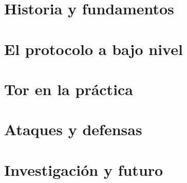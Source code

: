 \part{Historia y fundamentos}




\part{El protocolo a bajo nivel}












\part{Tor en la práctica}









\part{Ataques y defensas}



\part{Investigación y futuro}



\appendix




